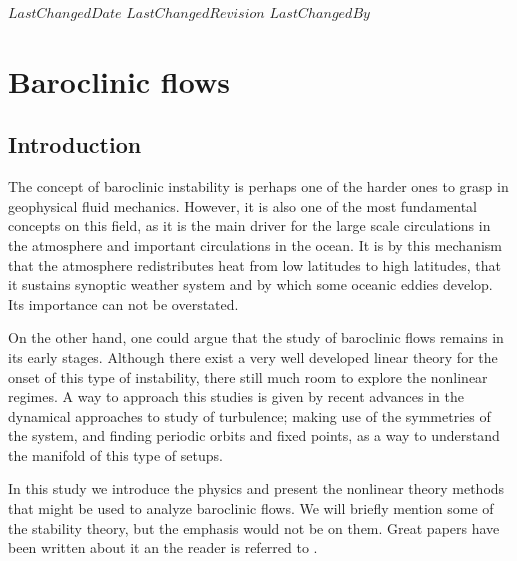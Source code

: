 {$LastChangedDate$}
{$LastChangedRevision$} {$LastChangedBy$}

\chapter{Baroclinic flows}
\label{chap:baroclinic}

\section{Introduction}
\label{s:intro}

The concept of baroclinic instability is perhaps one of the harder ones
to grasp in geophysical fluid mechanics. However, it is also one of the
most fundamental concepts on this field, as it is the main driver for the
large scale circulations in the atmosphere and important circulations in the
ocean. It is by this mechanism that the atmosphere redistributes heat from 
low latitudes to high latitudes, that it sustains synoptic weather system and by which some oceanic eddies develop. Its importance can not be overstated.

On the other hand, one could argue that the study of baroclinic flows
remains in its early stages. Although there exist a very well developed
linear theory for the onset of this type of instability, there still much
room to explore the nonlinear regimes. A way to approach this studies is
given by recent advances in the dynamical approaches to study of
turbulence;
making use of the symmetries of the system, and finding periodic orbits
and fixed points, as a way to understand the manifold of this type of
setups.

In this study we introduce the physics and present the nonlinear theory
methods that might be used to analyze baroclinic flows. We will briefly
mention some of the stability theory, but the emphasis would not be on
them. Great papers have been written about it an the reader is referred
to .

